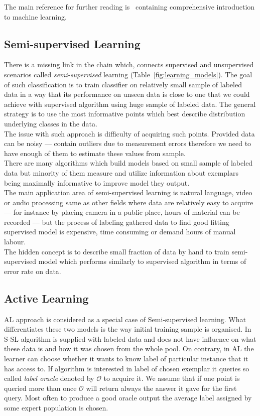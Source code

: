 \documentclass[12pt, a4paper, pdflatex]{report}
\begin{document}
The main reference for further reading is~\cite{flach2012machine} containing comprehensive introduction to machine learning.


\subsection{Semi-supervised Learning}
There is a missing link in the chain which, connects supervised and unsupervised scenarios called \emph{semi-supervised} learning (Table~\ref{fig:learning_models}). The goal of such classification is to train classifier on relatively small sample of labeled data in a way that its performance on unseen data is close to one that we could achieve with supervised algorithm using huge sample of labeled data. The general strategy is to use the most informative points which best describe distribution underlying classes in the data.\\
The issue with such approach is difficulty of acquiring such points. Provided data can be noisy --- contain outliers due to measurement errors therefore we need to have enough of them to estimate these values from sample.\\
There are many algorithms which build models based on small sample of labeled data but minority of them measure and utilize information about exemplars being maximally informative to improve model they output.\\

The main application area of semi-supervised learning is natural language, video or audio processing same as other fields where data are relatively easy to acquire --- for instance by placing camera in a public place, hours of material can be recorded --- but the process of labeling gathered data to find good fitting supervised model is expensive, time consuming or demand hours of manual labour.\\
The hidden concept is to describe small fraction of data by hand to train semi-supervised model which performs similarly to supervised algorithm in terms of error rate on data.

\subsection{Active Learning}
AL approach is considered as a special case of Semi-supervised learning. What differentiates these two models is the way initial training sample is organised. In S-SL algorithm is supplied with labeled data and does not have influence on what these data is and how it was chosen from the whole pool. On contrary, in AL the learner can choose whether it wants to know label of particular instance that it has access to. If algorithm is interested in label of chosen exemplar it queries so called \emph{label oracle} denoted by $\mathscr{O}$ to acquire it. We assume that if one point is queried more than once $\mathscr{O}$ will return always the answer it gave for the first query. Most often to produce a good oracle output the average label assigned by some expert population is chosen.\\
\end{document}
